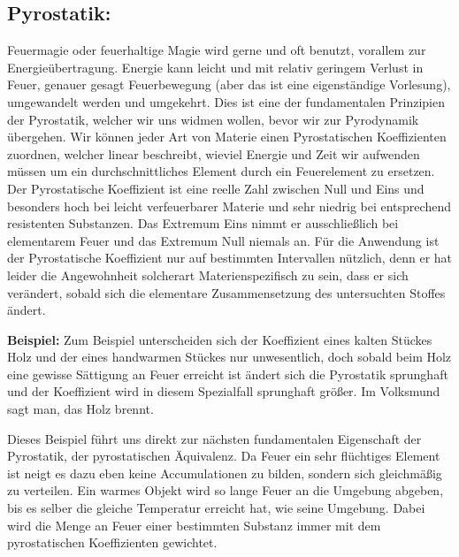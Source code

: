\documentclass[a5paper,8pt]{book}
\begin{document}
\subsection{Pyrostatik:}
Feuermagie oder feuerhaltige Magie wird gerne und oft benutzt, vorallem zur Energieübertragung. Energie kann leicht und mit 
relativ geringem Verlust in Feuer, genauer gesagt Feuerbewegung (aber das ist eine eigenständige Vorlesung), umgewandelt 
werden und umgekehrt. Dies ist eine der fundamentalen Prinzipien der Pyrostatik, welcher wir uns widmen wollen, bevor wir 
zur Pyrodynamik übergehen.
Wir können jeder Art von Materie einen Pyrostatischen Koeffizienten zuordnen, welcher linear beschreibt, wieviel Energie 
und Zeit wir aufwenden müssen um ein durchschnittliches Element durch ein Feuerelement zu ersetzen. Der Pyrostatische 
Koeffizient ist eine reelle Zahl zwischen Null und Eins und besonders hoch bei leicht verfeuerbarer Materie und sehr 
niedrig bei entsprechend resistenten Substanzen. Das Extremum Eins nimmt er ausschließlich bei elementarem Feuer und das 
Extremum Null niemals an.
Für die Anwendung ist der Pyrostatische Koeffizient nur auf bestimmten Intervallen nützlich, denn er hat leider die 
Angewohnheit solcherart Materienspezifisch zu sein, dass er sich verändert, sobald sich die elementare Zusammensetzung des 
untersuchten Stoffes ändert.

\textbf{Beispiel:}
Zum Beispiel unterscheiden sich der Koeffizient eines kalten Stückes Holz und der eines handwarmen Stückes nur 
unwesentlich, doch sobald beim Holz eine 
gewisse Sättigung an Feuer erreicht ist ändert sich die Pyrostatik sprunghaft und der Koeffizient wird in diesem 
Spezialfall sprunghaft größer. Im Volksmund sagt man, das Holz brennt.




Dieses Beispiel führt uns direkt zur nächsten fundamentalen Eigenschaft der Pyrostatik, der pyrostatischen Äquivalenz. Da 
Feuer ein sehr flüchtiges Element ist neigt es dazu eben keine Accumulationen zu bilden, sondern sich gleichmäßig zu 
verteilen. Ein warmes Objekt wird so lange Feuer an die Umgebung abgeben, bis es selber die gleiche Temperatur erreicht 
hat, wie seine Umgebung. Dabei wird die Menge an Feuer einer bestimmten Substanz immer mit dem pyrostatischen Koeffizienten 
gewichtet.
\end{document}
